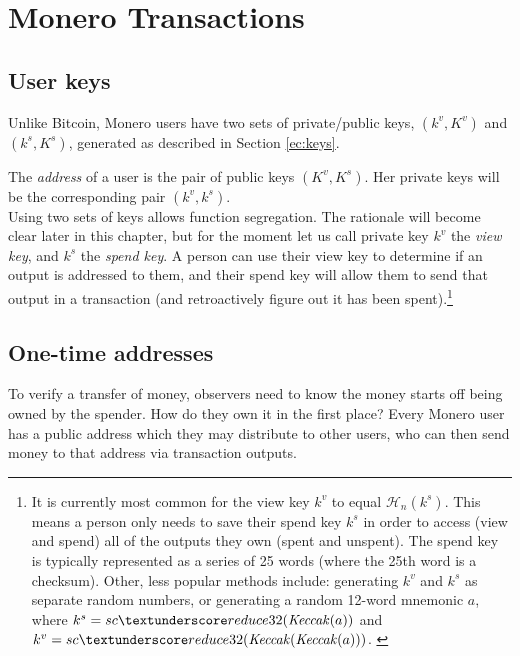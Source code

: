 \chapter{Monero Transactions}
\label{chapter:transactions}

\section{User keys}
\label{sec:user-keys}

Unlike Bitcoin, Monero users have two sets of private/public keys, \((k^v, K^v)\) and \( (k^s, K^s) \), generated as described in Section \ref{ec:keys}.

The {\em address} of a user is the pair of public keys \((K^v, K^s)\). Her private keys will be the corresponding pair \( (k^v, k^s) \).
\\

Using two sets of keys allows function segregation. The rationale will become clear later in this chapter, but for the moment let us call private key $k^v$ the {\em view key}, and $k^s$ the {\em spend key}. A person can use their view key to determine if an output is addressed to them, and their spend key will allow them to send that output in a transaction (and retroactively figure out it has been spent).\footnote{It is currently most common for the view key $k^v$ to equal $\mathcal{H}_n(k^s)$. This means a person only needs to save their spend key $k^s$ in order to access (view and spend) all of the outputs they own (spent and unspent). The spend key is typically represented as a series of 25 words (where the 25th word is a checksum). Other, less popular methods include: generating $k^v$ and $k^s$ as separate random numbers, or generating a random 12-word mnemonic $a$, where $k^s = sc\textunderscore reduce32(\mathit{Keccak}(a))$ and $k^v = sc\textunderscore reduce32(\mathit{Keccak}(\mathit{Keccak}(a)))$. \cite{luigi-address}}



\section{One-time addresses}
\label{sec:one-time-addresses}

To verify a transfer of money, observers need to know the money starts off being owned by the spender. How do they own it in the first place? Every Monero user has a public address which they may distribute to other users, who can then send money to that address via transaction outputs. 

